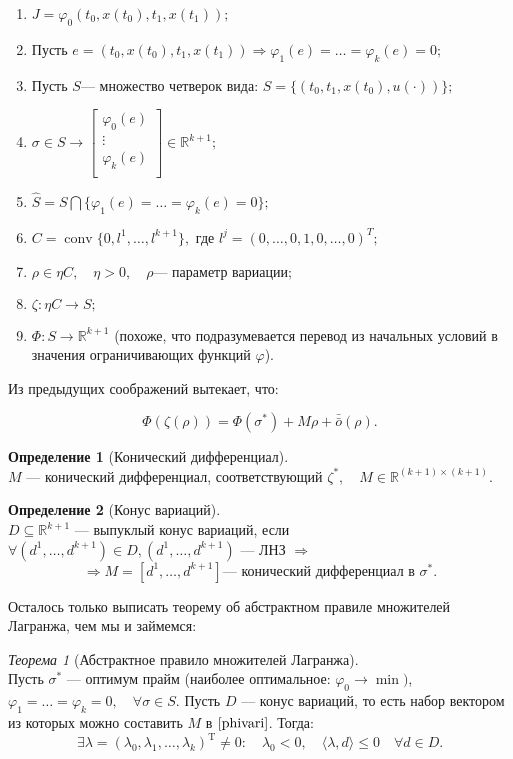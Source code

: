 \documentclass[oneside, final, 14pt, draft]{article}
\theoremstyle{definition}
\theoremstyle{definition}
\newtheorem{defin}{Определение}[section]
\theoremstyle{remark}
\theoremstyle{theorem}
\newtheorem{thm}{Теорема}[section]
\DeclareMathOperator{\conv}{conv}
\renewcommand{\phi}{\varphi}
\renewcommand{\leq}{\leqslant}
\begin{document}
\begin{enumerate}
\item $J = \phi_0(t_0, x(t_0), t_1, x(t_1));$
\item Пусть $e = (t_0, x(t_0), t_1, x(t_1)) \Rightarrow \phi_1(e) = \ldots = \phi_k(e) = 0;$
\item Пусть $S$--- множество четверок вида:
$S = \{(t_0, t_1, x(t_0), u(\cdot))\};$
\item 
$\sigma \in S \rightarrow  \begin{bmatrix}
			\phi_0(e)\\
			\vdots \\
			\phi_k(e)\\
   \end{bmatrix} \in \mathbb{R}^{k+1};$
\item $\hat{S} = S \bigcap \{\phi_1(e) = \ldots = \phi_k(e) = 0\};$
\item $C = \conv \{0, l^1, \ldots, l^{k+1}\}, $ где $ l^j = (0, \ldots, 0, 1, 0, \ldots, 0)^T;$
\item $\rho \in \eta C, \quad \eta>0, \quad \rho \text{--- параметр вариации};$
\item $\zeta: \eta C \rightarrow S;$
\item $\Phi: S \rightarrow \mathbb{R}^{k+1}$ (похоже, что подразумевается перевод из начальных условий в значения ограничивающих функций $\varphi$).
\end{enumerate}
Из предыдущих соображений вытекает, что:

\begin{equation}\label{phivari}
\Phi(\zeta (\rho)) =\Phi(\sigma^*) + M\rho +\bar{\bar{o}}(\rho).
\end{equation}

\begin{defin}[Конический дифференциал]\ \\
$M$ --- конический дифференциал, соответствующий $\zeta^*, \quad M \in \mathbb{R}^{(k+1)\times(k+1)}.$
\end{defin}
\begin{defin}[Конус вариаций]\ \\
$D\subseteq \mathbb{R}^{k+1}$ ---  выпуклый конус вариаций, если $\forall (d^1, \ldots, d^{k+1}) \in D, (d^1, \ldots, d^{k+1})$ --- ЛНЗ $\Rightarrow$
$$\Rightarrow M = [d^1, \ldots, d^{k+1}]\text{--- конический дифференциал в } \sigma^*.$$
\end{defin}
{\flushleft Осталось только выписать теорему об абстрактном правиле множителей Лагранжа, чем мы и займемся:}
\begin{thm}[Абстрактное правило множителей Лагранжа]\ \\
Пусть $\sigma^*$ --- оптимум прайм (наиболее оптимальное: $\phi_0 \rightarrow \min)$, $\phi_1 =\ldots =\phi_k = 0,\quad \forall \sigma \in S.$ Пусть $D$ --- конус вариаций, то есть набор вектором из которых можно составить $M$ в $\eqref{phivari}$. Тогда:
$$\exists \lambda = (\lambda_0, \lambda_1, \ldots, \lambda_k)^\mathrm{T} \neq 0: \quad \lambda_0 < 0, \quad \langle \lambda, d\rangle \leq 0 \quad \forall d \in D.$$
\end{thm}
\end{document}
